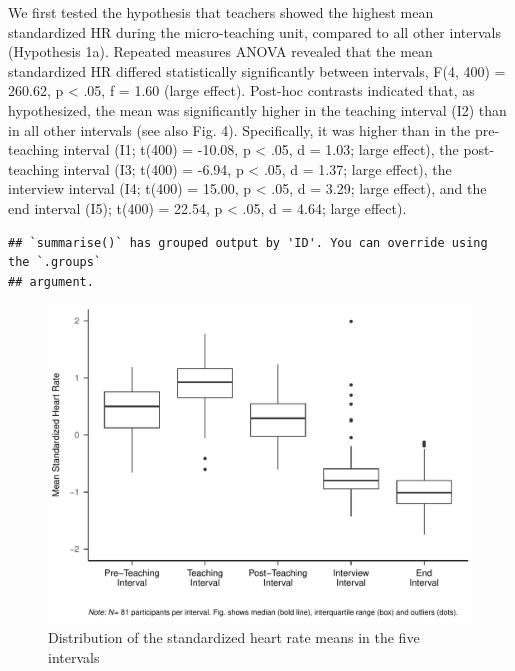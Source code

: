 \documentclass[preprint, 3p,
authoryear]{elsarticle} %
\begin{document}
We first tested the hypothesis that teachers showed the highest mean
standardized HR during the micro-teaching unit, compared to all other
intervals (Hypothesis 1a). Repeated measures ANOVA revealed that the
mean standardized HR differed statistically significantly between
intervals, F(4, 400) = 260.62, p \textless{} .05, f = 1.60 (large
effect). Post-hoc contrasts indicated that, as hypothesized, the mean
was significantly higher in the teaching interval (I2) than in all other
intervals (see also Fig. 4). Specifically, it was higher than in the
pre-teaching interval (I1; t(400) = -10.08, p \textless{} .05, d = 1.03;
large effect), the post-teaching interval (I3; t(400) = -6.94, p
\textless{} .05, d = 1.37; large effect), the interview interval (I4;
t(400) = 15.00, p \textless{} .05, d = 3.29; large effect), and the end
interval (I5); t(400) = 22.54, p \textless{} .05, d = 4.64; large
effect).

\begin{verbatim}
## `summarise()` has grouped output by 'ID'. You can override using the `.groups`
## argument.
\end{verbatim}

\begin{figure}[htbp]
  \centering
  \includegraphics[width=1\textwidth]{plots_publication/box_plot.pdf}
  \caption{Distribution of the standardized heart rate means in the five intervals}
  \label{Distribution of the standardized heart rate means in the five intervals}
\end{figure}


\end{document}
